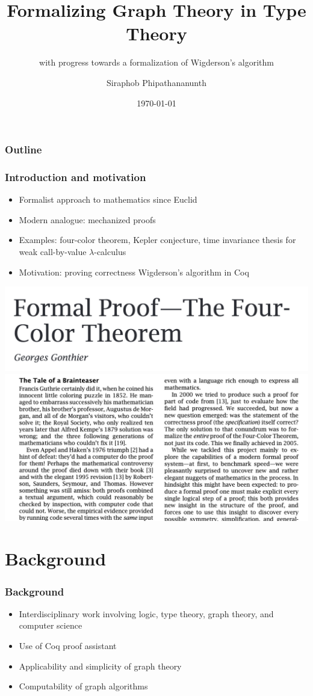 \documentclass{beamer}
\title{Formalizing Graph Theory in Type Theory}
\subtitle{with progress towards a formalization of Wigderson's algorithm}
\author{Siraphob Phipathananunth}
\date{\today}
\institute{Vanderbilt University}
\begin{document}
\frame{\titlepage}

\begin{frame}
\frametitle{Outline}
\tableofcontents
\end{frame}

\begin{frame}
\frametitle{Introduction and motivation}
\begin{itemize}
\item Formalist approach to mathematics since Euclid
\item Modern analogue: mechanized proofs
\item Examples: four-color theorem, Kepler conjecture, time invariance thesis for weak call-by-value $\lambda$-calculus
\item Motivation: proving correctness Wigderson's algorithm in Coq
\end{itemize}
\end{frame}

\begin{frame}
\includegraphics[width=\textwidth]{./images/gonthier.png}
\includegraphics[width=\textwidth]{./images/gonthier-text.png}
\end{frame}

\section{Background}
\begin{frame}
\frametitle{Background}
\begin{itemize}
\item Interdisciplinary work involving logic, type theory, graph theory, and computer science
\item Use of Coq proof assistant
\item Applicability and simplicity of graph theory
\item Computability of graph algorithms
\end{itemize}
\end{frame}
\end{document}
